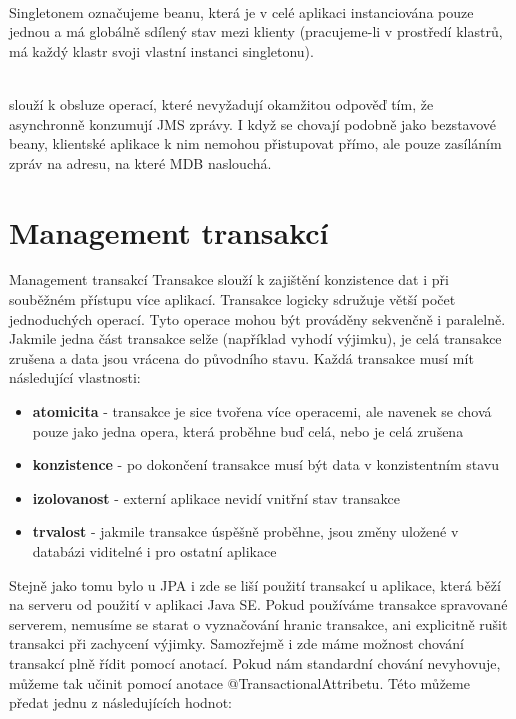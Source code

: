 \documentclass[122pt,oneside]{fithesis}
\begin{document}
\vspace{5 mm}
\\\indent Singletonem označujeme beanu, která je v celé aplikaci instanciována pouze jednou a má globálně sdílený stav mezi klienty (pracujeme-li v prostředí klastrů, má každý klastr svoji vlastní instanci singletonu).

\vspace{5 mm}
\\\indent slouží k obsluze operací, které nevyžadují okamžitou odpověď tím, že asynchronně konzumují JMS zprávy. I když se chovají podobně jako bezstavové beany, klientské aplikace k nim nemohou přistupovat přímo, ale pouze zasíláním zpráv na adresu, na které MDB naslouchá.


\section{Management transakcí}

Management transakcí
Transakce slouží k zajištění konzistence dat i při souběžném přístupu více aplikací. Transakce logicky sdružuje větší počet jednoduchých operací. Tyto operace mohou být prováděny sekvenčně i paralelně. Jakmile jedna část transakce selže (například vyhodí výjimku), je celá transakce zrušena a data jsou vrácena do původního stavu. Každá transakce musí mít následující vlastnosti:

\begin{itemize}
  \item {\bf atomicita} - transakce je sice tvořena více operacemi, ale navenek se chová pouze jako jedna opera, která proběhne buď celá, nebo je celá zrušena
  \item {\bf konzistence} - po dokončení transakce musí být data v konzistentním stavu
  \item {\bf izolovanost} - externí aplikace nevidí vnitřní stav transakce
  \item {\bf trvalost} - jakmile transakce úspěšně proběhne, jsou změny uložené v databázi viditelné i pro ostatní aplikace
\end{itemize}

Stejně jako tomu bylo u JPA i zde se liší použití transakcí u aplikace, která běží na serveru od použití v aplikaci Java SE. Pokud používáme transakce spravované serverem, nemusíme se starat o vyznačování hranic transakce, ani explicitně rušit transakci při zachycení výjimky. Samozřejmě i zde máme možnost chování transakcí plně řídit pomocí anotací. Pokud nám standardní chování nevyhovuje, můžeme tak učinit pomocí anotace @TransactionalAttribetu. Této můžeme předat jednu z následujících hodnot:
\end{document}
